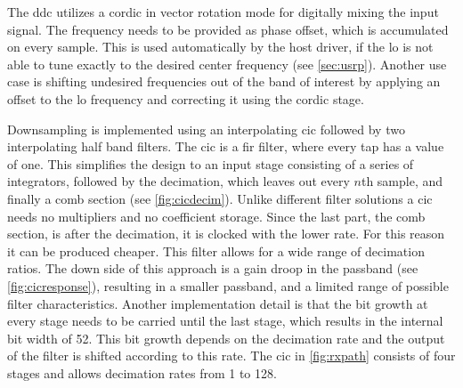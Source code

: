\documentclass[12pt,a4paper,parskip=full,abstracton]{scrartcl}
\begin{document}
The \gls{ddc} utilizes a \gls{cordic} in vector rotation mode for digitally
mixing the input signal. The frequency needs to be provided as phase offset,
which is accumulated on every sample. This is used automatically by the host driver,
if the \gls{lo} is not able to tune exactly to the desired center frequency (see \cref{sec:usrp}).
Another use case is shifting undesired frequencies out of the band of
interest by applying an offset to the \gls{lo} frequency and correcting
it using the \gls{cordic} stage.

Downsampling is implemented using an interpolating \gls{cic} followed by two
interpolating half band filters. The \gls{cic} is a \gls{fir} filter, where every tap has
a value of one. This simplifies the design to an input stage consisting
of a series of integrators, followed by the decimation, which leaves out every
$n$th sample, and finally a comb section (see \cref{fig:cicdecim}). Unlike different filter solutions
a \gls{cic} needs no multipliers and no coefficient storage. Since the last part, the comb section,
is after the decimation, it is clocked with the lower rate. For this reason it can be produced cheaper.
This filter allows for a wide range of decimation ratios. The down
side of this approach is a gain droop in the passband (see \cref{fig:cicresponse}), resulting in a smaller
passband, and a limited range of possible filter characteristics\cite{hog81}.
Another implementation detail is that the bit growth at every stage needs to
be carried until the last stage, which results in the internal bit width of
\SI{52}{\bit}. This bit growth depends on the decimation rate\cite{hog81} and
the output of the filter is shifted according to this rate. The \gls{cic} in
\cref{fig:rxpath} consists of four stages and allows decimation rates from 1 to 128.
\end{document}
